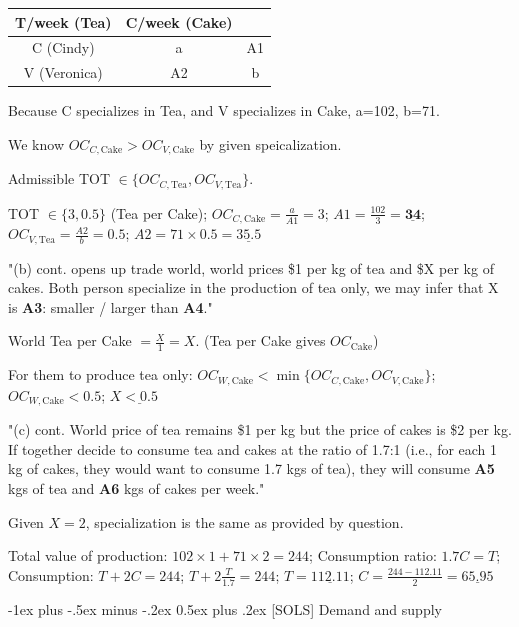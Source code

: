 \documentclass[a4paper]{article}
\makeatletter
\renewcommand{\section}{\@startsection{section}{1}{0mm}%
                                {-1ex plus -.5ex minus -.2ex}%
                                {0.5ex plus .2ex}%
                                {\normalfont\small\bfseries}}
\makeatother
\begin{document}
\begin{multicols*}{3}
    \begin{tabular}{|c|c|c|}
        \hline
        T/week (Tea) & C/week (Cake) &    \\ \hline
        C (Cindy)    & a             & A1 \\ \hline
        V (Veronica) & A2            & b  \\ \hline
    \end{tabular}

    Because C specializes in Tea, and V specializes in Cake, a=102, b=71.

    We know $OC_{C,\text{Cake}} > OC_{V,\text{Cake}}$ by given speicalization.

    Admissible TOT $\in \{OC_{C,\text{Tea}}, OC_{V,\text{Tea}}\}$.

    TOT $\in \{3, 0.5\}$ (Tea per Cake); $OC_{C,\text{Cake}} = \frac{a}{A1} = 3$; $A1 = \frac{102}{3} = \underline{\mathbf{34}}$; $OC_{V,\text{Tea}} = \frac{A2}{b} = 0.5$; $A2 = 71\times0.5 = \underline{\mathbf{35.5}}$

    "(b) cont. opens up trade world, world prices \$1 per kg of tea and \$X per kg of cakes. Both person specialize in the production of tea only, we may infer that X is \textbf{A3}: smaller / larger than \textbf{A4}."

    World Tea per Cake $= \frac{X}{1} = X$. (Tea per Cake gives $OC_\text{Cake}$)

    For them to produce tea only: $OC_{W,\text{Cake}} <\min\{OC_{C,\text{Cake}}, OC_{V,\text{Cake}}\}$; $OC_{W,\text{Cake}} <0.5$; $X \underline{\mathbf{<0.5}}$

    "(c) cont. World price of tea remains \$1 per kg but the price of cakes is \$2 per kg. If together decide to consume tea and cakes at the ratio of 1.7:1 (i.e., for each 1 kg of cakes, they would want to consume 1.7 kgs of tea), they will consume \textbf{A5} kgs of tea and \textbf{A6} kgs of cakes per week."

    Given $X=2$, specialization is the same as provided by question.

    Total value of production: $102 \times 1 + 71 \times 2 = 244$; Consumption ratio: $1.7C = T$; Consumption: $T + 2C = 244$; $T + 2\frac{T}{1.7} = 244$; $T = \underline{\mathbf{112.11}}$; $C = \frac{244-112.11}{2} = \underline{\mathbf{65.95}}$

    \section{[SOLS] Demand and supply}


\end{multicols*}
\end{document}
